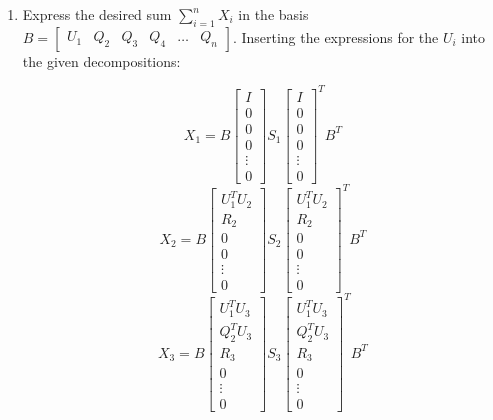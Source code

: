 \documentclass[english]{article}
\begin{document}
\begin{enumerate}
\item Express the desired sum $\sum_{i=1}^n X_i$ in the basis $B = \left[\begin{array}{cccccc} U_1 & Q_2 & Q_3 & Q_4 & \ldots & Q_n\end{array}\right]$. Inserting the expressions for the $U_i$ into the given decompositions:

$$X_1 = B \left[\begin{array}{c} I \\ 0 \\ 0 \\ 0\\ \vdots \\ 0\end{array}\right] S_1 \left[\begin{array}{c} I \\ 0 \\ 0 \\ 0\\ \vdots \\ 0\end{array}\right]^T  B^T$$
$$X_2 = B \left[\begin{array}{c} U_1^T U_2 \\ R_2 \\ 0 \\ 0 \\ \vdots \\ 0 \end{array}\right] S_2 \left[\begin{array}{c} U_1^T U_2 \\ R_2 \\ 0 \\ 0 \\ \vdots \\ 0 \end{array}\right]^T B^T$$
$$X_3 = B \left[\begin{array}{c} U_1^T U_3 \\ Q_2^T U_3 \\ R_3 \\ 0 \\ \vdots \\ 0 \end{array}\right] S_3 \left[\begin{array}{c} U_1^T U_3 \\ Q_2^T U_3 \\ R_3 \\ 0 \\ \vdots \\ 0 \end{array}\right]^T B^T$$

\end{enumerate}
\end{document}
